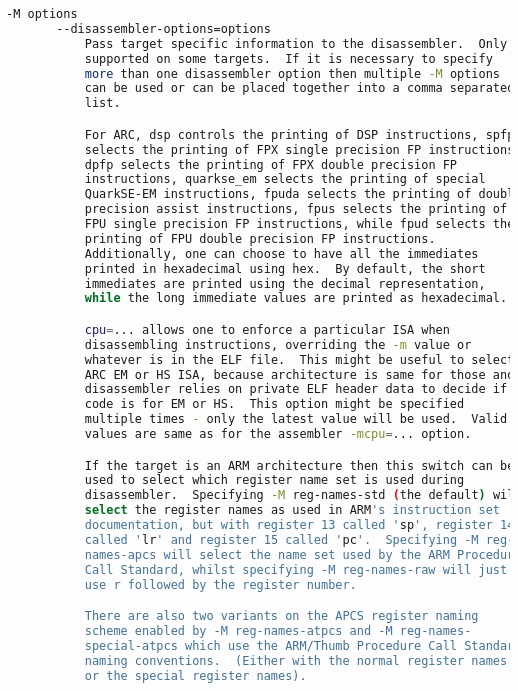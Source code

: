 {{\begin{lstlisting}[language=bash]
       -M options
       --disassembler-options=options
           Pass target specific information to the disassembler.  Only
           supported on some targets.  If it is necessary to specify
           more than one disassembler option then multiple -M options
           can be used or can be placed together into a comma separated
           list.

           For ARC, dsp controls the printing of DSP instructions, spfp
           selects the printing of FPX single precision FP instructions,
           dpfp selects the printing of FPX double precision FP
           instructions, quarkse_em selects the printing of special
           QuarkSE-EM instructions, fpuda selects the printing of double
           precision assist instructions, fpus selects the printing of
           FPU single precision FP instructions, while fpud selects the
           printing of FPU double precision FP instructions.
           Additionally, one can choose to have all the immediates
           printed in hexadecimal using hex.  By default, the short
           immediates are printed using the decimal representation,
           while the long immediate values are printed as hexadecimal.

           cpu=... allows one to enforce a particular ISA when
           disassembling instructions, overriding the -m value or
           whatever is in the ELF file.  This might be useful to select
           ARC EM or HS ISA, because architecture is same for those and
           disassembler relies on private ELF header data to decide if
           code is for EM or HS.  This option might be specified
           multiple times - only the latest value will be used.  Valid
           values are same as for the assembler -mcpu=... option.

           If the target is an ARM architecture then this switch can be
           used to select which register name set is used during
           disassembler.  Specifying -M reg-names-std (the default) will
           select the register names as used in ARM's instruction set
           documentation, but with register 13 called 'sp', register 14
           called 'lr' and register 15 called 'pc'.  Specifying -M reg-
           names-apcs will select the name set used by the ARM Procedure
           Call Standard, whilst specifying -M reg-names-raw will just
           use r followed by the register number.

           There are also two variants on the APCS register naming
           scheme enabled by -M reg-names-atpcs and -M reg-names-
           special-atpcs which use the ARM/Thumb Procedure Call Standard
           naming conventions.  (Either with the normal register names
           or the special register names).


\end{lstlisting}}}
